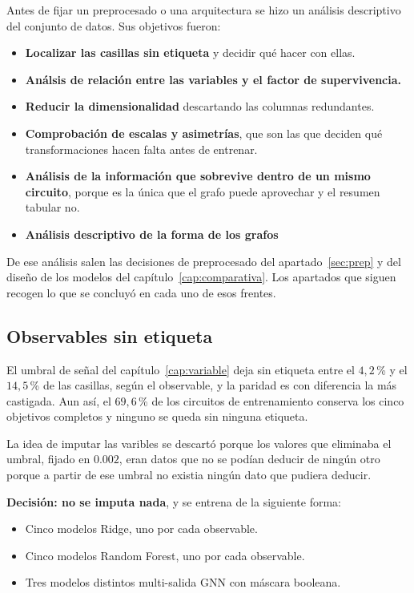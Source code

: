 Antes de fijar un preprocesado o una arquitectura se hizo un análisis descriptivo del conjunto de datos.
Sus objetivos fueron:

\begin{itemize}
    \item \textbf{Localizar las casillas sin etiqueta} y decidir qué hacer con ellas.
    \item \textbf{Análsis de relación entre las variables y el factor de supervivencia.}
    \item \textbf{Reducir la dimensionalidad} descartando las columnas redundantes.
    \item \textbf{Comprobación de escalas y asimetrías}, que son las que deciden qué
          transformaciones hacen falta antes de entrenar.
    \item \textbf{Análisis de la información que sobrevive dentro de un mismo circuito}, porque es
          la única que el grafo puede aprovechar y el resumen tabular no.
    \item \textbf{Análisis descriptivo de la forma de los grafos} 
\end{itemize}

De ese análisis salen las decisiones de preprocesado del apartado~\ref{sec:prep} y del
diseño de los modelos del capítulo~\ref{cap:comparativa}. Los apartados que siguen recogen lo que
se concluyó en cada uno de esos frentes.

\subsection{Observables sin etiqueta}
\label{sec:eda_nulos}

El umbral de señal del capítulo~\ref{cap:variable} deja sin etiqueta entre el $4{,}2$\,\% y el
$14{,}5$\,\% de las casillas, según el observable, y la paridad es con diferencia la más
castigada. Aun así, el $69{,}6$\,\% de los circuitos de entrenamiento conserva los cinco
objetivos completos y ninguno se queda sin ninguna etiqueta. 

La idea de imputar las varibles se descartó porque los valores que eliminaba el umbral, fijado en $0.002$, eran datos que no se podían deducir de ningún otro porque a partir de ese umbral no existia ningún dato que pudiera deducir.

\textbf{Decisión: no se imputa
nada}, y se entrena de la siguiente forma:
\begin{itemize}
    \item Cinco modelos Ridge, uno por cada observable.
    \item Cinco modelos Random Forest, uno por cada observable.
    \item Tres modelos distintos multi-salida GNN con máscara booleana.
\end{itemize}

